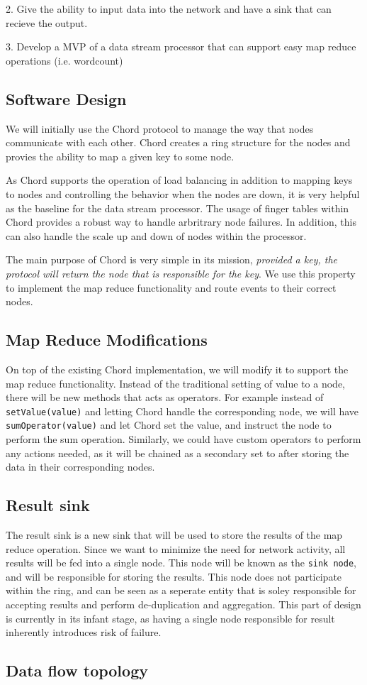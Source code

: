 \documentclass[journal]{IEEEtran}
\begin{document}
2. Give the ability to input data into the network and have a sink that can recieve 
the output.

3. Develop a MVP of a data stream processor that can support easy map reduce operations 
(i.e. wordcount)
\subsection{Software Design}

We will initially use the Chord protocol to manage the way that nodes communicate with each other. 
Chord creates a ring structure for the nodes and provies the ability to map a given key to some node.

As Chord supports the operation of load balancing in addition to mapping keys to nodes and controlling
the behavior when the nodes are down, it is very helpful as the baseline for the data stream processor.
The usage of finger tables within Chord provides a robust way to handle arbritrary node failures. In addition,
this can also handle the scale up and down of nodes within the processor.

The main purpose of Chord is very simple in its mission, \textit{provided a key, the protocol will
return the node that is responsible for the key}. We use this property to implement the map reduce functionality
and route events to their correct nodes.

\subsection{Map Reduce Modifications}
On top of the existing Chord implementation, we will modify it 
to support the map reduce functionality. Instead of the traditional setting
of value to a node, there will be new methods that acts as operators. For example
instead of \texttt{setValue(value)} and letting Chord handle the corresponding node,
we will have \texttt{sumOperator(value)} and let Chord set the value, and instruct the
node to perform the sum operation. Similarly, we could have custom operators to perform
any actions needed, as it will be chained as a secondary set to after storing the data in their
corresponding nodes.

\subsection{Result sink}
The result sink is a new sink that will be used to store the results of the map reduce operation. Since
we want to minimize the need for network activity, all results will be fed into a single node. This node
will be known as the \texttt{sink node}, and will be responsible for storing the results. This node does
not participate within the ring, and can be seen as a seperate entity that is soley responsible for accepting
results and perform de-duplication and aggregation. This part of design is currently in its infant stage, as
having a single node responsible for result inherently introduces risk of failure.

\subsection{Data flow topology}
\end{document}
